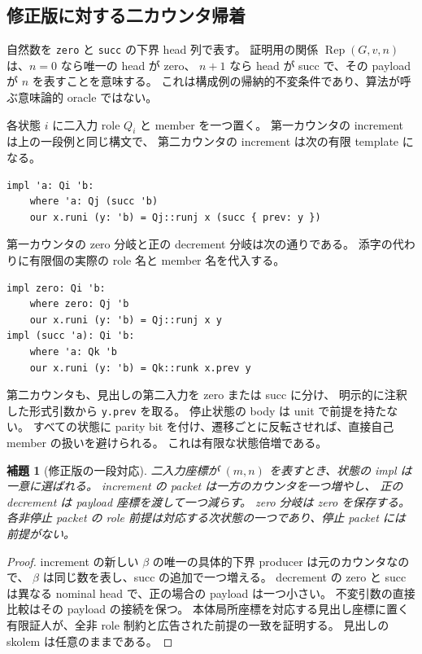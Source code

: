 \documentclass[11pt,a4paper]{article}
\newtheorem{lemma}[theorem]{補題}
\theoremstyle{remark}
\begin{document}
\subsection{修正版に対する二カウンタ帰着}

自然数を \texttt{zero} と \texttt{succ} の下界 head 列で表す。
証明用の関係 $\operatorname{Rep}(G,v,n)$ は、$n=0$ なら唯一の head が zero、
$n+1$ なら head が succ で、その payload が $n$ を表すことを意味する。
これは構成例の帰納的不変条件であり、算法が呼ぶ意味論的 oracle ではない。

各状態 $i$ に二入力 role $Q_i$ と member を一つ置く。
第一カウンタの increment は上の一段例と同じ構文で、
第二カウンタの increment は次の有限 template になる。

\begin{Verbatim}[fontsize=\small]
impl 'a: Qi 'b:
    where 'a: Qj (succ 'b)
    our x.runi (y: 'b) = Qj::runj x (succ { prev: y })
\end{Verbatim}

第一カウンタの zero 分岐と正の decrement 分岐は次の通りである。
添字の代わりに有限個の実際の role 名と member 名を代入する。

\begin{Verbatim}[fontsize=\small]
impl zero: Qi 'b:
    where zero: Qj 'b
    our x.runi (y: 'b) = Qj::runj x y
impl (succ 'a): Qi 'b:
    where 'a: Qk 'b
    our x.runi (y: 'b) = Qk::runk x.prev y
\end{Verbatim}

第二カウンタも、見出しの第二入力を zero または succ に分け、
明示的に注釈した形式引数から \texttt{y.prev} を取る。
停止状態の body は unit で前提を持たない。
すべての状態に parity bit を付け、遷移ごとに反転させれば、直接自己 member の扱いを避けられる。
これは有限な状態倍増である。

\begin{lemma}[修正版の一段対応]
二入力座標が $(m,n)$ を表すとき、状態の impl は一意に選ばれる。
increment の packet は一方のカウンタを一つ増やし、
正の decrement は payload 座標を渡して一つ減らす。
zero 分岐は zero を保存する。
各非停止 packet の role 前提は対応する次状態の一つであり、停止 packet には前提がない。
\end{lemma}
\begin{proof}
increment の新しい $\beta$ の唯一の具体的下界 producer は元のカウンタなので、
$\beta$ は同じ数を表し、succ の追加で一つ増える。
decrement の zero と succ は異なる nominal head で、正の場合の payload は一つ小さい。
不変引数の直接比較はその payload の接続を保つ。
本体局所座標を対応する見出し座標に置く有限証人が、全非 role 制約と広告された前提の一致を証明する。
見出しの skolem は任意のままである。
\end{proof}
\end{document}
